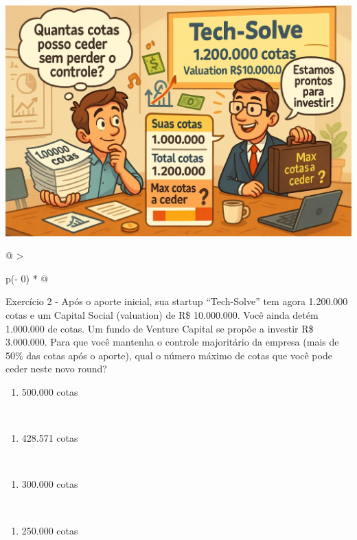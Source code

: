 \documentclass[
]{book}
\providecommand{\tightlist}{%
  \setlength{\itemsep}{0pt}\setlength{\parskip}{0pt}}
\begin{document}
\includegraphics[width=7.03125in,height=\textheight]{images/03-2025-08-19_20/exercicio-02.jpg}

\begin{longtable}[]{@{}
  >{\raggedright\arraybackslash}p{(\columnwidth - 0\tabcolsep) * }@{}}
\toprule\noalign{}
\endhead
\bottomrule\noalign{}
\endlastfoot
Exercício 2 - Após o aporte inicial, sua startup ``Tech-Solve'' tem agora 1.200.000 cotas e um Capital Social (valuation) de R\$ 10.000.000. Você ainda detém 1.000.000 de cotas. Um fundo de Venture Capital se propõe a investir R\$ 3.000.000. Para que você mantenha o controle majoritário da empresa (mais de 50\% das cotas após o aporte), qual o número máximo de cotas que você pode ceder neste novo round? \\
\begin{minipage}[t]{\linewidth}\raggedright
\begin{enumerate}
\def\labelenumi{\alph{enumi})}
\tightlist
\item
  500.000 cotas
\end{enumerate}
\end{minipage} \\
\begin{minipage}[t]{\linewidth}\raggedright
\begin{enumerate}
\def\labelenumi{\alph{enumi})}
\setcounter{enumi}{1}
\tightlist
\item
  428.571 cotas
\end{enumerate}
\end{minipage} \\
\begin{minipage}[t]{\linewidth}\raggedright
\begin{enumerate}
\def\labelenumi{\alph{enumi})}
\setcounter{enumi}{2}
\tightlist
\item
  300.000 cotas
\end{enumerate}
\end{minipage} \\
\begin{minipage}[t]{\linewidth}\raggedright
\begin{enumerate}
\def\labelenumi{\alph{enumi})}
\setcounter{enumi}{3}
\tightlist
\item
  250.000 cotas
\end{enumerate}
\end{minipage} \\
\end{longtable}
\end{document}
